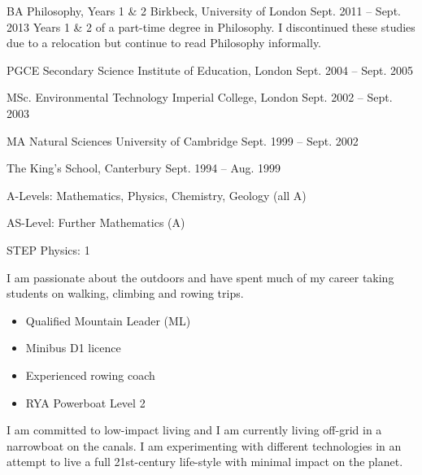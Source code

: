 \documentclass[11pt, a4paper]{awesome-cv}
\begin{document}

\begin{cventries}

  \cventry
  {BA Philosophy, Years 1 \& 2} %
  {Birkbeck, University of London} %
  {Sept. 2011 -- Sept. 2013} %
  {} %
  {Years 1 \& 2 of a part-time degree in Philosophy. I discontinued these studies due to a relocation but continue to read Philosophy informally.}

  \cventry
  {PGCE Secondary Science} %
  {Institute of Education, London} %
  {Sept. 2004 -- Sept. 2005} %
  {} %
  {}

  \cventry
  {MSc. Environmental Technology} %
  {Imperial College, London} %
  {Sept. 2002 -- Sept. 2003} %
  {} %
  {}

  \cventry
  {MA Natural Sciences} %
  {University of Cambridge} %
  {Sept. 1999 -- Sept. 2002} %
  {} %
  {}

  \cventry
  {} %
  {The King's School, Canterbury} %
  {Sept. 1994 -- Aug. 1999} %
  {} %
  {\begin{cvitems}
    \item A-Levels: Mathematics, Physics, Chemistry, Geology (all A)
    \item AS-Level: Further Mathematics (A)
    \item STEP Physics: 1
  \end{cvitems}
  }
\end{cventries}



\begin{cvparagraph}
  I am passionate about the outdoors and have spent much of my career taking students on walking, climbing and rowing trips.
  
  \begin{itemize}
    \item Qualified Mountain Leader (ML)
    \item Minibus D1 licence
    \item Experienced rowing coach
    \item RYA Powerboat Level 2
    \end{itemize}
\end{cvparagraph}


\begin{cvparagraph}
  I am committed to low-impact living and I am currently living off-grid in a narrowboat on the canals. I am experimenting with different technologies in an attempt to live a full 21st-century life-style with minimal impact on the planet.
\end{cvparagraph}
\end{document}
